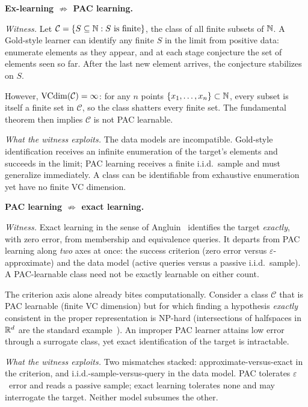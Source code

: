 
\begin{separation}
\textbf{Ex-learning $\not\Rightarrow$ PAC learning.}

\medskip\noindent
\emph{Witness.}
Let $\mathcal{C} = \{ S \subseteq \mathbb{N} : S \text{ is finite} \}$, the
class of all finite subsets of $\mathbb{N}$. A Gold-style learner can identify
any finite $S$ in the limit from positive data: enumerate elements as
they appear, and at each stage conjecture the set of elements seen so
far. After the last new element arrives, the conjecture stabilizes on
$S$.

However, $\mathrm{VCdim}(\mathcal{C}) = \infty$: for any $n$ points
$\{x_1, \ldots, x_n\} \subset \mathbb{N}$, every subset is itself a finite set
in $\mathcal{C}$, so the class shatters every finite set. The
fundamental theorem then implies $\mathcal{C}$ is not PAC learnable.

\medskip\noindent
\emph{What the witness exploits.}
The data models are incompatible. Gold-style identification receives an
infinite enumeration of the target's elements and succeeds in the limit;
PAC learning receives a finite i.i.d.\ sample and must generalize
immediately. A class can be identifiable from exhaustive enumeration yet
have no finite VC dimension.

\hfill\cite{Gold1967}
\end{separation}


\begin{separation}
\textbf{PAC learning $\not\Rightarrow$ exact learning.}

\medskip\noindent
\emph{Witness.}
Exact learning in the sense of Angluin~\cite{Angluin1988} identifies the
target \emph{exactly}, with zero error, from membership and equivalence
queries.  It departs from PAC learning along \emph{two} axes at once: the
success criterion (zero error versus $\varepsilon$-approximate) and the
data model (active queries versus a passive i.i.d.\ sample).  A
PAC-learnable class need not be exactly learnable on either count.

The criterion axis alone already bites computationally. Consider a class
$\mathcal{C}$ that is PAC learnable (finite VC dimension) but for which
finding a hypothesis \emph{exactly} consistent in the proper representation
is NP-hard (intersections of halfspaces in $\mathbb{R}^d$ are the standard
example~\cite{PittValiant1988}). An improper PAC learner attains low error
through a surrogate class, yet exact identification of the target is
intractable.

\medskip\noindent
\emph{What the witness exploits.}
Two mismatches stacked: approximate-versus-exact in the criterion, and
i.i.d.-sample-versus-query in the data model. PAC tolerates
$\varepsilon$~error and reads a passive sample; exact learning tolerates
none and may interrogate the target. Neither model subsumes the other.

\hfill\cite{Angluin1988, PittValiant1988}
\end{separation}

